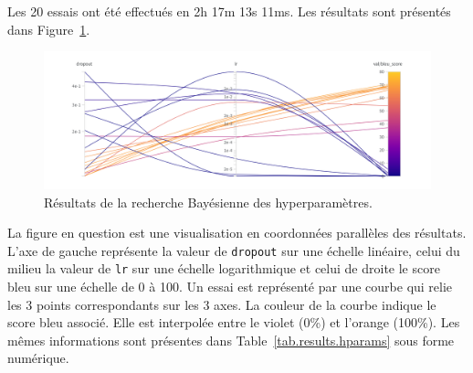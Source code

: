 Les 20 essais ont été effectués en 2h 17m 13s 11ms.
Les résultats sont présentés dans Figure~\ref{fig.results.hparams}.
\begin{figure}[hbt]
    \centering
    \includegraphics[width=.8\textwidth]{assets/images/sweep.png}
    \caption{Résultats de la recherche Bayésienne des hyperparamètres.}%
    \label{fig.results.hparams}
\end{figure}
La figure en question est une visualisation en coordonnées parallèles des résultats.
L'axe de gauche représente la valeur de \verb|dropout| sur une échelle linéaire, 
celui du milieu la valeur de \verb|lr| sur une échelle logarithmique 
et celui de droite le score \gls{bleu} sur une échelle de 0 à 100.
Un essai est représenté par une courbe qui relie les 3 points correspondants sur les 3 axes.
La couleur de la courbe indique le score \gls{bleu} associé.
Elle est interpolée entre le violet (0\%) et l'orange (100\%).
Les mêmes informations sont présentes dans Table~\ref{tab.results.hparams} sous forme numérique.

\begin{table}[htb]
    \begin{center}
    \end{center}
    \caption{Résultats de la recherche Bayésienne des hyperparamètres.}%
    \label{tab.results.hparams}
\end{table}

